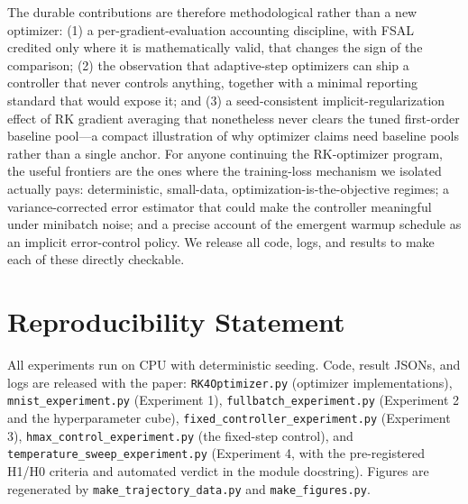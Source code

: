 \documentclass{article}
\begin{document}
The durable contributions are therefore methodological rather than a new optimizer: (1) a per-gradient-evaluation accounting discipline, with FSAL credited only where it is mathematically valid, that changes the sign of the comparison; (2) the observation that adaptive-step optimizers can ship a controller that never controls anything, together with a minimal reporting standard that would expose it; and (3) a seed-consistent implicit-regularization effect of RK gradient averaging that nonetheless never clears the tuned first-order baseline pool---a compact illustration of why optimizer claims need baseline pools rather than a single anchor. For anyone continuing the RK-optimizer program, the useful frontiers are the ones where the training-loss mechanism we isolated actually pays: deterministic, small-data, optimization-is-the-objective regimes; a variance-corrected error estimator that could make the controller meaningful under minibatch noise; and a precise account of the emergent warmup schedule as an implicit error-control policy. We release all code, logs, and results to make each of these directly checkable.

\section*{Reproducibility Statement}

All experiments run on CPU with deterministic seeding. Code, result JSONs, and logs are released with the paper: \texttt{RK4Optimizer.py} (optimizer implementations), \texttt{mnist\_experiment.py} (Experiment 1), \texttt{fullbatch\_experiment.py} (Experiment 2 and the hyperparameter cube), \texttt{fixed\_controller\_experiment.py} (Experiment 3), \texttt{hmax\_control\_experiment.py} (the fixed-step control), and \texttt{temperature\_sweep\_experiment.py} (Experiment 4, with the pre-registered H1/H0 criteria and automated verdict in the module docstring). Figures are regenerated by \texttt{make\_trajectory\_data.py} and \texttt{make\_figures.py}.



\end{document}
